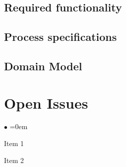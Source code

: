 \documentclass[english]{article}
\begin{document}
		\subsection{Required functionality}

		\subsection{Process specifications}

		\subsection{Domain Model}

	\section{Open Issues}
		\begin{list}{$\bullet$}{\leftmargin=1.5cm \itemindent=0em}
			\item Item 1
			\item Item 2
		\end{list}
\end{document}
